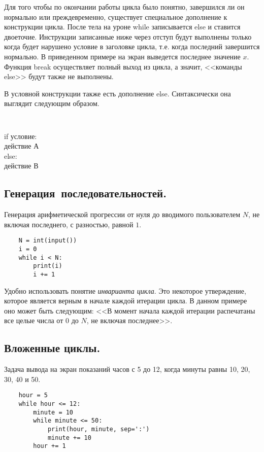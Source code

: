 \documentclass[a4paper, fleqn]{article}
\begin{document}
	Для того чтобы по окончании работы цикла было понятно, завершился ли он нормально или преждевременно, существует специальное дополнение к конструкции цикла. После тела на уроне while записывается else и ставится двоеточие. Инструкции записанные ниже через отступ будут выполнены только когда будет нарушено условие в заголовке цикла, т.е. когда последний завершится нормально. В приведенном примере на экран выведется последнее значение $x$. Функция break осуществляет полный выход из цикла, а значит, <<команды else>> будут также не выполнены.
	
	
	В условной конструкции также есть дополнение else. Синтаксически она выглядит следующим образом.
	\begin{lstlisting}
	
	\end{lstlisting}
	if условие:\\
	\qquad действие А\\
	else: \\
	\qquad действие В\\
	
	
	\subsection*{Генерация~последовательностей.}
	
	
	Генерация арифметической прогрессии от нуля до вводимого пользователем $N$, не включая последнего, с разностью, равной $1$. 
	\begin{lstlisting}
	N = int(input())
	i = 0
	while i < N:
		print(i)
		i += 1
	\end{lstlisting}
	
	Удобно использовать понятие \emph{инварианта цикла}. Это некоторое утверждение, которое является верным в начале каждой итерации цикла. В данном примере оно может быть следующим: <<В момент начала каждой итерации распечатаны все целые числа от $0$ до $N$, не включая последнее>>. 
	
	\subsection*{Вложенные циклы.}
	
	Задача вывода на экран показаний часов с 5 до 12, когда минуты равны 10, 20, 30, 40 и 50.
	\begin{lstlisting}
	hour = 5
	while hour <= 12:
		minute = 10
		while minute <= 50:
			print(hour, minute, sep=':')
			minute += 10
		hour += 1
	\end{lstlisting}
	
\end{document}
